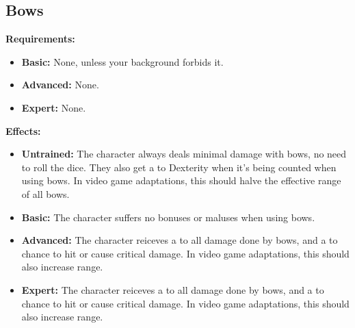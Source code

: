 \subsection{Bows}
\begin{table}[!ht]
\centering
{}
\end{table}
\textbf{Requirements:}
\begin{itemize}
	\item \textbf{Basic:} None, unless your background forbids it.
	\item \textbf{Advanced:} None.
	\item \textbf{Expert:} None.
\end{itemize}
\textbf{Effects:}
\begin{itemize}
	\item \textbf{Untrained:} The character always deals minimal damage with bows, no need to roll the dice. They also get a  to Dexterity when it's being counted when using bows. In video game adaptations, this should halve the effective range of all bows.
	\item \textbf{Basic:} The character suffers no bonuses or maluses when using bows.
	\item \textbf{Advanced:} The character reiceves a  to all damage done by bows, and a  to chance to hit or cause critical damage. In video game adaptations, this should also increase range.
	\item \textbf{Expert:} The character reiceves a  to all damage done by bows, and a  to chance to hit or cause critical damage. In video game adaptations, this should also increase range.
\end{itemize}\newpage
\
